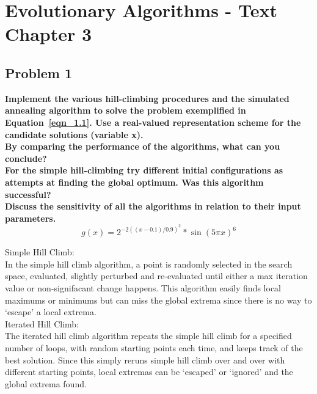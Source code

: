 
\chapter{Evolutionary Algorithms - Text Chapter 3}

\section{Problem 1}
\textbf{Implement the various hill-climbing procedures and the simulated annealing algorithm to solve the problem exemplified in Equation~\ref{eqn_1.1}. Use a real-valued representation scheme for the candidate solutions (variable x).} \newline \\
\textbf{By comparing the performance of the algorithms, what can you conclude?} \newline \\
\textbf{For the simple hill-climbing try different initial configurations as attempts at finding the global optimum. Was this algorithm successful?} \newline \\
\textbf{Discuss the sensitivity of all the algorithms in relation to their input parameters.} \newline \\
\begin{equation}\label{eqn_1.1}
g(x) = 2^{-2((x - 0.1) / 0.9)^2} * \sin(5 \pi x)^6
\end{equation}

Simple Hill Climb: \\

In the simple hill climb algorithm, a point is randomly selected in the search space, evaluated, slightly perturbed and re-evaluated until either a max iteration value or non-signifacant change happens.  This algorithm easily finds local maximums or minimums but can miss the global extrema since there is no way to `escape' a local extrema.\\

Iterated Hill Climb: \\

The iterated hill climb algorithm repeats the simple hill climb for a specified number of loops, with random starting points each time, and keeps track of the best solution. Since this simply reruns simple hill climb over and over with different starting points, local extremas can be `escaped' or `ignored' and the global extrema found. \\

